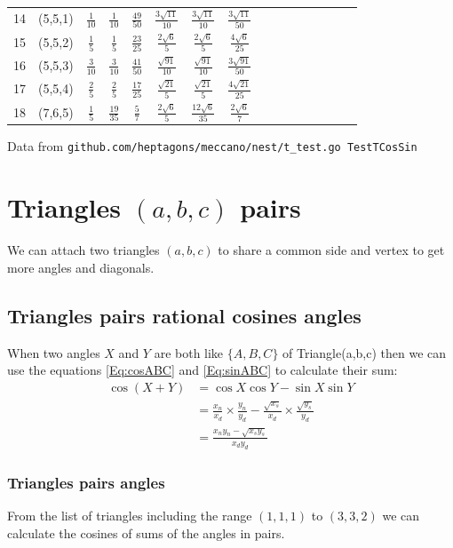 \documentclass[11pt]{article}
\begin{document}
\begin{longtable}{ | p{1cm}| *{15}{c|} }
14 & (5,5,1) & $\frac{1}{10}$ & $\frac{1}{10}$ & $\frac{49}{50}$ & $\frac{3\sqrt{11}}{10}$ & $\frac{3\sqrt{11}}{10}$ & $\frac{3\sqrt{11}}{50}$\\
15 & (5,5,2) & $\frac{1}{5}$ & $\frac{1}{5}$ & $\frac{23}{25}$ & $\frac{2\sqrt{6}}{5}$ & $\frac{2\sqrt{6}}{5}$ & $\frac{4\sqrt{6}}{25}$\\
16 & (5,5,3) & $\frac{3}{10}$ & $\frac{3}{10}$ & $\frac{41}{50}$ & $\frac{\sqrt{91}}{10}$ & $\frac{\sqrt{91}}{10}$ & $\frac{3\sqrt{91}}{50}$\\
17 & (5,5,4) & $\frac{2}{5}$ & $\frac{2}{5}$ & $\frac{17}{25}$ & $\frac{\sqrt{21}}{5}$ & $\frac{\sqrt{21}}{5}$ & $\frac{4\sqrt{21}}{25}$\\
18 & (7,6,5) & $\frac{1}{5}$ & $\frac{19}{35}$ & $\frac{5}{7}$ & $\frac{2\sqrt{6}}{5}$ & $\frac{12\sqrt{6}}{35}$ & $\frac{2\sqrt{6}}{7}$\\
\end{longtable}
Data from \texttt{github.com/heptagons/meccano/nest/t\_test.go TestTCosSin}




\section{Triangles $(a,b,c)$ pairs}

We can attach two triangles $(a,b,c)$ to share a common side and vertex to get more angles and diagonals.

\subsection{Triangles pairs rational cosines angles}
When two angles $X$ and $Y$ are both like $\{A,B,C\}$ of Triangle(a,b,c) then we can use
the equations \ref{Eq:cosABC} and \ref{Eq:sinABC} to calculate their sum:
\begin{align}
\cos{(X+Y)} &= \cos{X}\cos{Y} - \sin{X}\sin{Y}\\
 &= \frac{x_n}{x_d} \times \frac{y_n}{y_d} - \frac{\sqrt{x_s}}{x_d} \times \frac{\sqrt{y_s}}{y_d}\\
 &= \frac{x_ny_n - \sqrt{x_sy_s}}{x_dy_d}
\end{align}

\subsubsection{Triangles pairs angles}
From the list of triangles including the range $(1,1,1)$ to $(3,3,2)$
we can calculate the cosines of sums of the angles in pairs.
\end{document}
